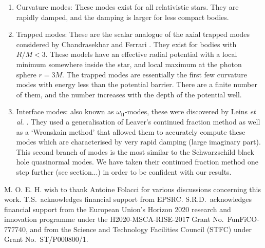 \documentclass[aps,prd,longbibliography,reprint,twocolumn,amsmath,amssymb,amsfonts,showpacs,superscriptaddress]{revtex4-1}%
\begin{document}
	\begin{enumerate}
		\item Curvature modes: These modes exist for all relativistic stars. They are rapidly damped, and the damping is larger for less compact bodies.
		\item Trapped modes: These are the scalar analogue of the axial trapped modes considered by Chandrasekhar and Ferrari \cite{Chandrasekhar449}. They exist for bodies with $R/M < 3$. These models have an effective radial potential with a local minimum somewhere inside the star, and local maximum at the photon sphere $r=3M$. The trapped modes are essentially the first few curvature modes with energy less than the potential barrier. There are a finite number of them, and the number increases with the depth of the potential well.
		\item Interface modes: also known as $\omega_{\text{II}}$-modes, these were discovered by Leins \textit{et al.} \cite{Leins:1993zz}. They used a generalisation of Leaver's continued fraction  method as well as a `Wronskain method' that allowed them to accurately compute these modes which are characterised by very rapid damping (large imaginary part). This second branch of modes is the most similar to the Schwarzschild black hole quasinormal modes. We have taken their continued fraction method one step further (see section...) in order to be confident with our results.
	\end{enumerate}


\acknowledgments
M. O. E. H. wish to thank Antoine Folacci for various discussions concerning this work. T.S.~acknowledges financial support from EPSRC. S.R.D.~acknowledges financial support from the European Union's Horizon 2020 research and innovation programme under the H2020-MSCA-RISE-2017 Grant No.~FunFiCO-777740, and from the Science and Technology Facilities Council (STFC) under Grant No.~ST/P000800/1.




%
\end{document}

